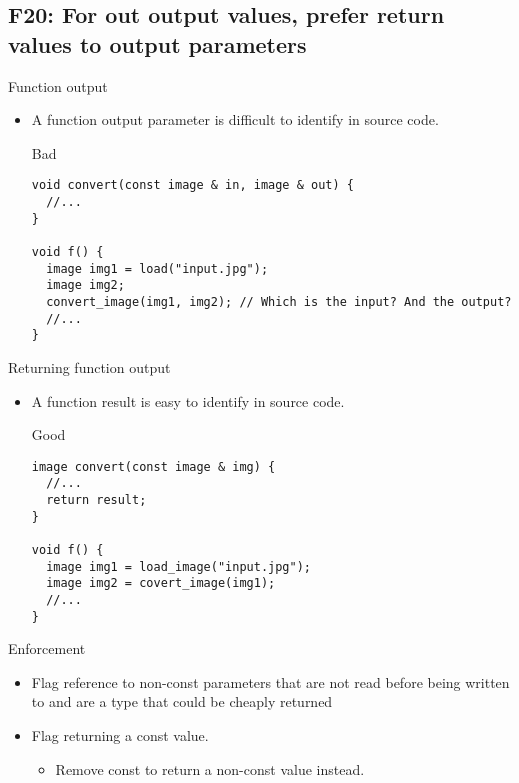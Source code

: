 \subsection{F20: For out output values, prefer return values to output parameters }

\begin{frame}[t,fragile]{Function output}
\begin{itemize}
  \item A function output parameter is difficult to identify in source code.

\begin{block}{Bad}
\begin{lstlisting}
void convert(const image & in, image & out) {
  //...
}

void f() {
  image img1 = load("input.jpg");
  image img2;
  convert_image(img1, img2); // Which is the input? And the output?
  //...
}
\end{lstlisting}
\end{block}
\end{itemize}
\end{frame}

\begin{frame}[t,fragile]{Returning function output}
\begin{itemize}
  \item A function result is easy to identify in source code.

\begin{block}{Good}
\begin{lstlisting}
image convert(const image & img) {
  //...
  return result;
}

void f() {
  image img1 = load_image("input.jpg");
  image img2 = covert_image(img1);
  //...
}
\end{lstlisting}
\end{block}

\end{itemize}
\end{frame}

\begin{frame}[t]{Enforcement}
\begin{itemize}

  \item Flag reference to non-const parameters that are not read before being written to 
        and are a type that could be cheaply returned

  \item Flag returning a const value.
    \begin{itemize}
      \item Remove const to return a non-const value instead.
    \end{itemize}

\end{itemize}
\end{frame}

